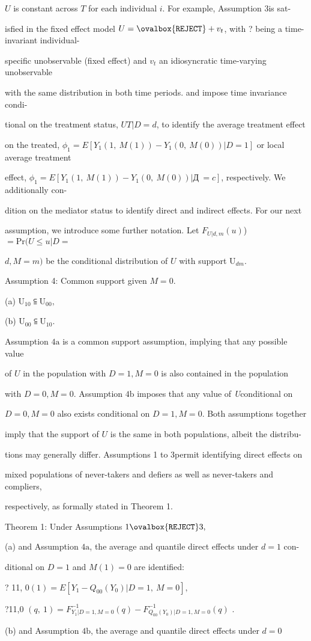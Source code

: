 \documentclass[a4paper,12pt]{article}
\begin{document}
$U$ is constant across $T$ for each individual $i$. For example, Assumption 3is sat-

isfied in the fixed effect model $U=\ovalbox{\tt\small REJECT} +v_{t}$, with ? being a time-invariant individual-

specific unobservable (fixed effect) and $v_{t}$ an idiosyncratic time-varying unobservable

with the same distribution in both time periods. and impose time invariance condi-

tional on the treatment status, $UT|D=d$, to identify the average treatment effect

on the treated, $\phi_{1}=E[Y_{1}(1,\ M(1))-Y_{1}(0,\ M(0))|D=1]$ or local average treatment

effect, $\phi_{1}=E[Y_{1}(1,\ M(1))-Y_{1}(0,\ M(0))|Д\ =c]$, respectively. We additionally con-

dition on the mediator status to identify direct and indirect effects. For our next

assumption, we introduce some further notation. Let $F_{U|d,m}(u)$) $=\mathrm{P}\mathrm{r}(U\leq u|D =$

$d, M=m)$ be the conditional distribution of $U$ with support $\mathrm{U}_{dm}.$

Assumption 4: Common support given $M=0.$

(a) $\mathrm{U}_{10}\subseteqq \mathrm{U}_{00},$

(b) $\mathrm{U}_{00}\subseteqq \mathrm{U}_{10}.$

Assumption $4\mathrm{a}$ is a common support assumption, implying that any possible value

of $U$ in the population with $D = 1, M = 0$ is also contained in the population

with $D = 0, M = 0$. Assumption $4\mathrm{b}$ imposes that any value of {\it U}conditional on

$D=0, M=0$ also exists conditional on $D=1, M=0$. Both assumptions together

imply that the support of $U$ is the same in both populations, albeit the distribu-

tions may generally differ. Assumptions 1 to 3permit identifying direct effects on

mixed populations of never-takers and defiers as well as never-takers and compliers,

respectively, as formally stated in Theorem 1.

Theorem 1: Under Assumptions $1\ovalbox{\tt\small REJECT} 3,$

(a) and Assumption $4\mathrm{a}$, the average and quantile direct effects under $d= 1$ con-

ditional on $D=1$ and $M(1)=0$ are identified:
\begin{center}
? 11, $0(1)=E[Y_{1}-Q_{00}(Y_{0})|D=1,\ M=0],$

?11,0 $(q,\ 1)=F_{Y_{1}|D=1,M=0}^{-1}(q)-F_{Q_{00}(Y_{0})|D=1,M=0}^{-1}(q)$ .
\end{center}
(b) and Assumption $4\mathrm{b}$, the average and quantile direct effects under $d=0$
\end{document}
